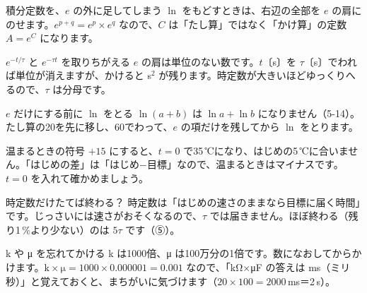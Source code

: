 
\begin{tsumazuki}{積分定数を、$e$ の外に足してしまう}
$\ln$ をもどすときは、右辺の全部を $e$ の肩にのせます。$e^{p+q}=e^p\times e^q$ なので、$C$ は「たし算」ではなく「かけ算」の定数 $A=e^C$ になります。
\end{tsumazuki}

\begin{tsumazuki}{$e^{-t/\tau}$ と $e^{-\tau t}$ を取りちがえる}
$e$ の肩は単位のない数です。$t$〔s〕を $\tau$〔s〕でわれば単位が消えますが、かけると s$^2$ が残ります。時定数が大きいほどゆっくりへるので、$\tau$ は分母です。
\end{tsumazuki}

\begin{tsumazuki}{$e$ だけにする前に $\ln$ をとる}
$\ln(a+b)$ は $\ln a+\ln b$ になりません（5-14）。たし算の20を先に移し、60でわって、$e$ の項だけを残してから $\ln$ をとります。
\end{tsumazuki}

\begin{tsumazuki}{温まるときの符号}
$+15$ にすると、$t=0$ で35\,℃になり、はじめの5\,℃に合いません。「はじめの差」は「はじめ$-$目標」なので、温まるときはマイナスです。$t=0$ を入れて確かめましょう。
\end{tsumazuki}

\begin{tsumazuki}{時定数だけたてば終わる？}
時定数は「はじめの速さのままなら目標に届く時間」です。じっさいには速さがおそくなるので、$\tau$ では届きません。ほぼ終わる（残り1\,\%より少ない）のは $5\tau$ です（⑤）。
\end{tsumazuki}

\begin{tsumazuki}{k や μ を忘れてかける}
k は1000倍、μ は100万分の1倍です。数になおしてからかけます。$\text{k}\times\text{μ}=1000\times0.000001=0.001$ なので、「kΩ×μF の答えは ms（ミリ秒）」と覚えておくと、まちがいに気づけます（$20\times100=2000$\,ms＝2\,s）。
\end{tsumazuki}

